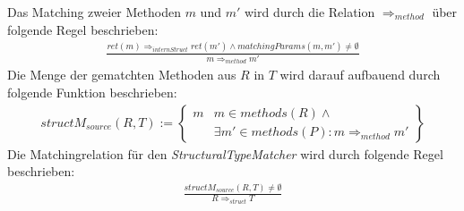 \noindent
Das Matching zweier Methoden $m$ und $m'$ wird durch die Relation $\Rightarrow_{method}$ über folgende Regel beschrieben:
\begin{gather*}
\frac{\mathit{ret(m)} \Rightarrow_{internStruct} \mathit{ret(m')} \wedge \mathit{matchingParams(m,m')} \neq \emptyset}{m \Rightarrow_{method} m'}
\end{gather*}
\noindent
Die Menge der gematchten Methoden aus $R$ in $T$ wird darauf aufbauend durch folgende Funktion beschrieben:
\begin{gather*}
structM_{source}(R,T) := \left\{ 
				\begin{array}{l|l}
m	& \mathit{m} \in \mathit{methods(R)} \wedge \mathit{ }
\\
	& \exists \mathit{m'} \in \mathit{methods(P)} : m \Rightarrow_{method} m'
				\end{array}
              \right\}
\end{gather*}
\noindent
Die Matchingrelation für den \emph{StructuralTypeMatcher} wird durch folgende Regel beschrieben:
\begin{gather*}
\frac{structM_{source}(R,T) \neq \emptyset}{R \Rightarrow_{struct}T}
\end{gather*}


